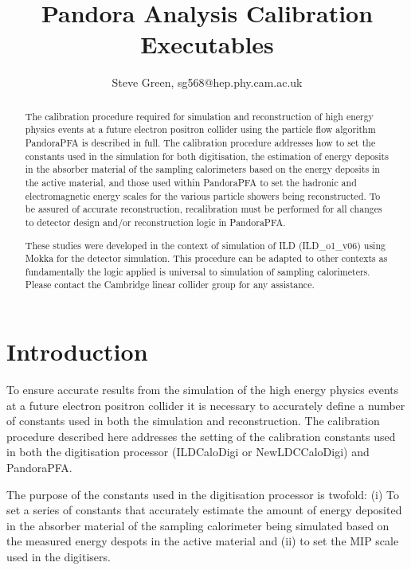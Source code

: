 \documentclass[11pt, oneside]{article}   	%
\title{Pandora Analysis Calibration Executables}
\author{Steve Green, sg568@hep.phy.cam.ac.uk}
\date{}							%
\begin{document}
\maketitle


\begin{abstract}
The calibration procedure required for simulation and reconstruction of high energy physics events at a future electron positron collider using the particle flow algorithm PandoraPFA is described in full.  The calibration procedure addresses how to set the constants used in the simulation for both digitisation, the estimation of energy deposits in the absorber material of the sampling calorimeters based on the energy deposits in the active material, and those used within PandoraPFA to set the hadronic and electromagnetic energy scales for the various particle showers being reconstructed.  To be assured of accurate reconstruction, recalibration must be performed for all changes to detector design and/or  reconstruction logic in PandoraPFA.

These studies were developed in the context of simulation of ILD (ILD\_o1\_v06) using Mokka for the detector simulation.  This procedure can be adapted to other contexts as fundamentally the logic applied is universal to simulation of sampling calorimeters.  Please contact the Cambridge linear collider group for any assistance.
\end{abstract}


\section{Introduction}

To ensure accurate results from the simulation of the high energy physics events at a future electron positron collider it is necessary to accurately define a number of constants used in both the simulation and reconstruction.  The calibration procedure described here addresses the setting of the calibration constants used in both the digitisation processor (ILDCaloDigi or NewLDCCaloDigi) and PandoraPFA.

The purpose of the constants used in the digitisation processor is twofold: (i) To set a series of constants that accurately estimate the amount of energy deposited in the absorber material of the sampling calorimeter being simulated based on the measured energy despots in the active material and (ii) to set the MIP scale used in the digitisers.  
\end{document}
